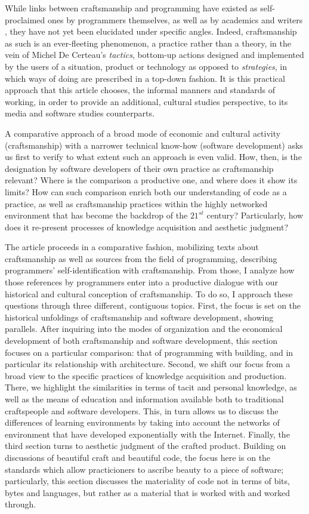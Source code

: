 \documentclass{article}
\begin{document}
While links between craftsmanship and programming have existed as self-proclaimed ones by programmers themselves, as well as by academics and writers \cite{sennett_craftsman_2009,chandra_geek_2014}, they have not yet been elucidated under specific angles. Indeed, craftsmanship as such is an ever-fleeting phenomenon, a practice rather than a theory, in the vein of Michel De Certeau's \textit{tactics}, bottom-up actions designed and implemented by the users of a situation, product or technology as opposed to \textit{strategies}\cite{certeau_invention_1990}, in which ways of doing are prescribed in a top-down fashion. It is this practical approach that this article chooses, the informal manners and standards of working, in order to provide an additional, cultural studies perspective, to its media and software studies counterparts.

A comparative approach of a broad mode of economic and cultural activity (craftsmanship) with a narrower technical know-how (software development) asks us first to verify to what extent such an approach is even valid. How, then, is the designation by software developers of their own practice as craftsmanship relevant? Where is the comparison a productive one, and where does it show its limits? How can such comparison enrich both our understanding of code as a practice, as well as craftsmanship practices within the highly networked environment that has become the backdrop of the $21^{st}$ century? Particularly, how does it re-present processes of knowledge acquisition and aesthetic judgment?

The article proceeds in a comparative fashion, mobilizing texts about craftsmanship as well as sources from the field of programming, describing programmers' self-identification with craftsmanship. From those, I analyze how those references by programmers enter into a productive dialogue with our historical and cultural conception of craftsmanship. To do so, I approach these questions through three different, contiguous topics. First, the focus is set on the historical unfoldings of craftsmanship and software development, showing parallels. After inquiring into the modes of organization and the economical development of both craftsmanship and software development, this section focuses on a particular comparison: that of programming with building, and in particular its relationship with architecture. Second, we shift our focus from a broad view to the specific practices of knowledge acquisition and production. There, we highlight the similarities in terms of tacit and personal knowledge, as well as the means of education and information available both to traditional craftspeople and software developers. This, in turn allows us to discuss the differences of learning environments by taking into account the networks of environment that have developed exponentially with the Internet. Finally, the third section turns to aesthetic judgment of the crafted product. Building on discussions of beautiful craft and beautiful code, the focus here is on the standards which allow practicioners to ascribe beauty to a piece of software; particularly, this section discusses the materiality of code not in terms of bits, bytes and languages, but rather as a material that is worked with and worked through.
\end{document}
